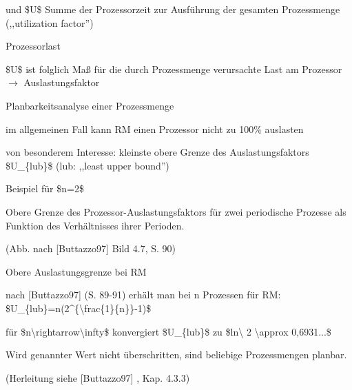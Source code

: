 \documentclass[a4paper]{article}
\begin{document}
\begin{multicols}{3}
\begin{itemize*}
\begin{itemize*}
            \item und \$U\$ Summe der Prozessorzeit zur Ausführung der gesamten Prozessmenge (,,utilization factor'')
        \end{itemize*}
        \item
        Prozessorlast
        \begin{itemize*}
            \item \$U\$ ist folglich Maß für die durch Prozessmenge verursachte Last am Prozessor $\rightarrow$ Auslastungsfaktor
        \end{itemize*}
        \item
        Planbarkeitsanalyse einer Prozessmenge
        \begin{itemize*}
            \item im allgemeinen Fall kann RM einen Prozessor nicht zu 100\% auslasten
            \item von besonderem Interesse: kleinste obere Grenze des Auslastungsfaktors \$U\_\{lub\}\$ (lub: ,,least upper bound'')
        \end{itemize*}
        \item
        Beispiel für \$n=2\$
        \begin{itemize*}
            \item Obere Grenze des Prozessor-Auslastungsfaktors für zwei periodische Prozesse als Funktion des Verhältnisses ihrer Perioden.
            \item (Abb. nach {[}Buttazzo97{]} Bild 4.7, S. 90)
        \end{itemize*}
        \item
        Obere Auslastungsgrenze bei RM
        \begin{itemize*}
            \item nach {[}Buttazzo97{]} (S. 89-91) erhält man bei n Prozessen für RM: \$U\_\{lub\}=n(2\^{}\{\textbackslash frac\{1\}\{n\}\}-1)\$
            \item für \$n\textbackslash rightarrow\textbackslash infty\$ konvergiert \$U\_\{lub\}\$ zu \$ln\textbackslash{} 2 \textbackslash approx 0,6931...\$
            \item Wird genannter Wert nicht überschritten, sind beliebige Prozessmengen planbar.
            \item (Herleitung siehe {[}Buttazzo97{]} , Kap. 4.3.3)
        \end{itemize*}
    \end{itemize*}



\end{multicols}
\end{document}
